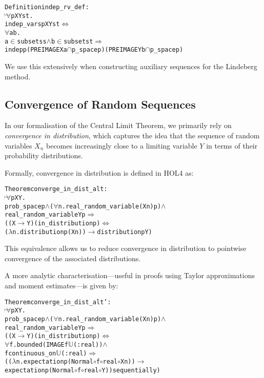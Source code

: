 \begin{hol}
\begin{alltt}
Definition indep\_rv\_def :
\(\!\!\!{\turn}\!\!\!\!\) \(\forall\)p X Y s t.
indep\_vars p X Y s t \({\Leftrightarrow}\)
\(\forall\)a b.
  a \(\in\) subsets s \(\land\) b \(\in\) subsets t \(\Rightarrow\)
  indep p (PREIMAGE X a \(\cap\) p\_space p) (PREIMAGE Y b \(\cap\) p\_space p)
\end{alltt}
\end{hol}

We use this extensively when constructing auxiliary sequences for the Lindeberg method.

\subsection{Convergence of Random Sequences}

In our formalisation of the Central Limit Theorem, we primarily rely on \emph{convergence in distribution}, which captures the idea that the sequence of random variables $X_n$ becomes increasingly close to a limiting variable $Y$ in terms of their probability distributions.

Formally, convergence in distribution is defined in HOL4 as:
\begin{hol}
\begin{alltt}
Theorem converge\_in\_dist\_alt :
\(\!\!\!{\turn}\!\!\!\!\) \(\forall\)p X Y.
prob\_space p \(\land\) (\(\forall\)n. real\_random\_variable (X n) p) \(\land\)
real\_random\_variable Y p \(\Rightarrow\)
((X \(\longrightarrow\) Y) (in\_distribution p) \({\Leftrightarrow}\)
 (\(\lambda\)n. distribution p (X n)) \(\longrightarrow\) distribution p Y)
\end{alltt}
\end{hol}

This equivalence allows us to reduce convergence in distribution to pointwise convergence of the associated distributions.

A more analytic characterisation—useful in proofs using Taylor approximations and moment estimates—is given by:
\begin{hol}
\begin{alltt}
Theorem converge\_in\_dist\_alt' :
\(\!\!\!{\turn}\!\!\!\!\) \(\forall\)p X Y.
prob\_space p \(\land\) (\(\forall\)n. real\_random\_variable (X n) p) \(\land\)
real\_random\_variable Y p \(\Rightarrow\)
((X \(\longrightarrow\) Y) (in\_distribution p) \({\Leftrightarrow}\)
 \(\forall\)f. bounded (IMAGE f \(\mathbb{U}\)(:real)) \(\land\)
        f continuous\_on \(\mathbb{U}\)(:real) \(\Rightarrow\)
   ((\(\lambda\)n. expectation p (Normal \(\circ\) f \(\circ\) real \(\circ\) X n)) \(\longrightarrow\)
    expectation p (Normal \(\circ\) f \(\circ\) real \(\circ\) Y)) sequentially)
\end{alltt}
\end{hol}

